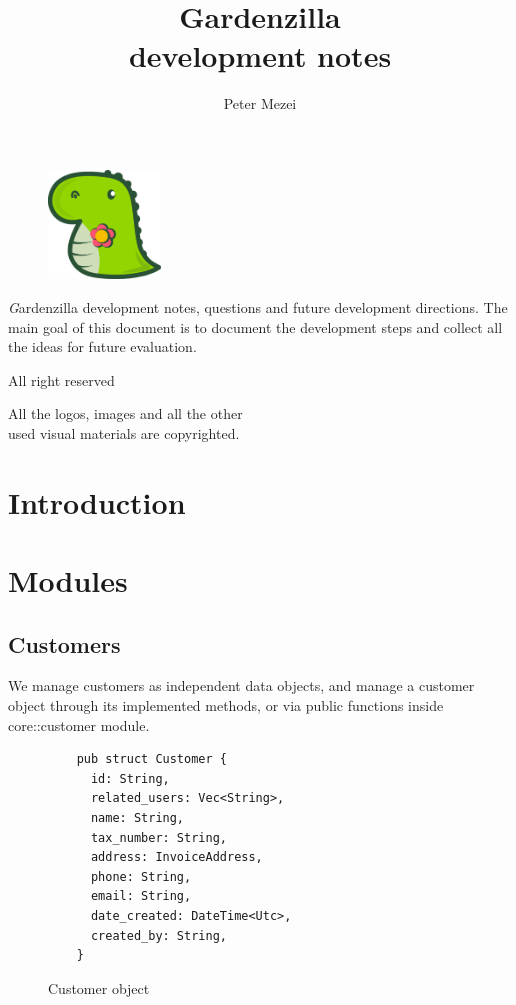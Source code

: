 \documentclass{article}
\author{Peter Mezei}
\title{Gardenzilla \\ development notes}
\begin{document}
\maketitle
\newpage
\thispagestyle{empty}
\begin{figure}
  \centering
  \includegraphics[width=3cm]{logo.png}
\end{figure}
\begin{center}
  {\textit  Gardenzilla development notes, questions and future development directions. The main goal of this document is to document the development steps and collect all the ideas for future evaluation.

    \vspace{1cm} All right reserved \the\year{}

    All the logos, images and all the other\\ used visual materials are copyrighted.
  }
\end{center}
\newpage
\thispagestyle{empty}
\tableofcontents
\newpage
\section{Introduction}
\newpage

\section{Modules}

\subsection{Customers}

We manage customers as independent data objects, and manage a customer
object through its implemented methods, or via public functions inside
core::customer module.

\begin{figure}[!htb]
  \caption{Customer object}
  \begin{verbatim}
    pub struct Customer {
      id: String,
      related_users: Vec<String>,
      name: String,
      tax_number: String,
      address: InvoiceAddress,
      phone: String,
      email: String,
      date_created: DateTime<Utc>,
      created_by: String,
    }
  \end{verbatim}
\end{figure}
\end{document}
